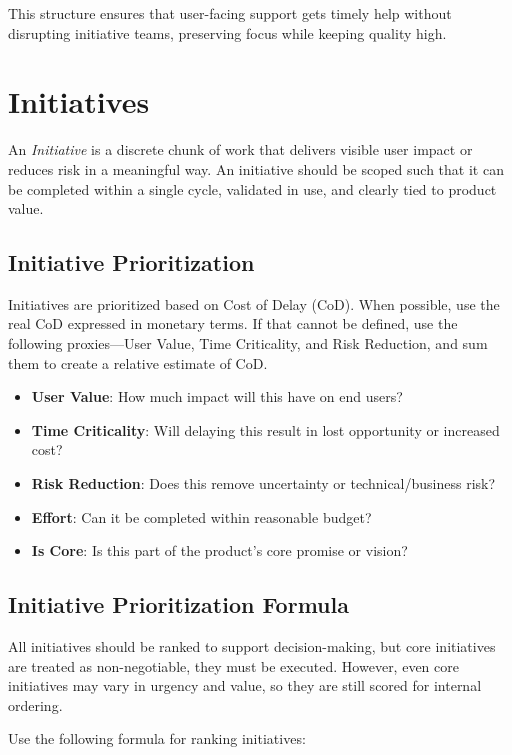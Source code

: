 \documentclass[a4paper]{article}
\begin{document}
This structure ensures that user-facing support gets timely help without disrupting initiative teams, preserving focus while keeping quality high.

\section{Initiatives}

An \textit{Initiative} is a discrete chunk of work that delivers visible user impact or reduces risk in a meaningful way. An initiative should be scoped such that it can be completed within a single cycle, validated in use, and clearly tied to product value.

\subsection*{Initiative Prioritization}

Initiatives are prioritized based on Cost of Delay (CoD). When possible, use the real CoD expressed in monetary terms. If that cannot be defined, use the following proxies—User Value, Time Criticality, and Risk Reduction, and sum them to create a relative estimate of CoD.

\begin{itemize}
    \item \textbf{User Value}: How much impact will this have on end users?
    \item \textbf{Time Criticality}: Will delaying this result in lost opportunity or increased cost?
    \item \textbf{Risk Reduction}: Does this remove uncertainty or technical/business risk?
    \item \textbf{Effort}: Can it be completed within reasonable budget?
    \item \textbf{Is Core}: Is this part of the product's core promise or vision?
\end{itemize}

\subsection*{Initiative Prioritization Formula}

All initiatives should be ranked to support decision-making, but core initiatives are treated as non-negotiable, they must be executed. However, even core initiatives may vary in urgency and value, so they are still scored for internal ordering.

Use the following formula for ranking initiatives:
\end{document}
